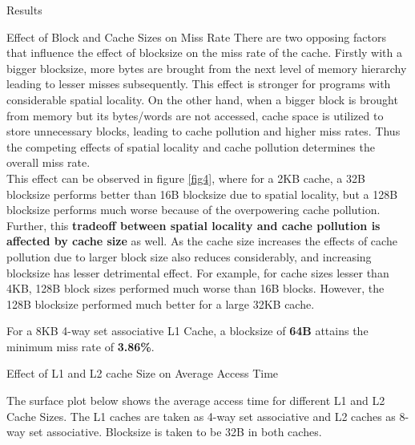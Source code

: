 \begin{section}{Results}
\begin{subsection}{Effect of Block and Cache Sizes on Miss Rate}
    There are two opposing factors that influence the effect of blocksize on the miss rate of the cache. Firstly with a bigger blocksize, more bytes are brought from the next level of memory hierarchy leading to lesser misses subsequently. This effect is stronger for programs with considerable spatial locality. On the other hand, when a bigger block is brought from memory but its bytes/words are not accessed, cache space is utilized to store unnecessary blocks, leading to cache pollution and higher miss rates. Thus the competing effects of spatial locality and cache pollution determines the overall miss rate.\\
    This effect can be observed in figure \ref{fig4}, where for a 2KB cache, a 32B blocksize performs better than 16B blocksize due to spatial locality, but a 128B blocksize performs much worse because of the overpowering cache pollution.\\
    Further, this \textbf{tradeoff between spatial locality and cache pollution is affected by cache size} as well. As the cache size increases the effects of cache pollution due to larger block size also reduces considerably, and increasing blocksize has lesser detrimental effect. For example, for cache sizes lesser than 4KB, 128B block sizes performed much worse than 16B blocks. However, the 128B blocksize performed much better for a large 32KB cache.   

    For a 8KB 4-way set associative L1 Cache, a blocksize of \textbf{64B} attains the minimum miss rate of \textbf{3.86\%}.
    
    \end{subsection}

    \begin{subsection}{Effect of L1 and L2 cache Size on Average Access Time}

    The surface plot below shows the average access time for different L1 and L2 Cache Sizes. The L1 caches are taken as 4-way set associative and L2 caches as 8-way set associative. Blocksize is taken to be 32B in both caches.


\end{subsection}
\end{section}
